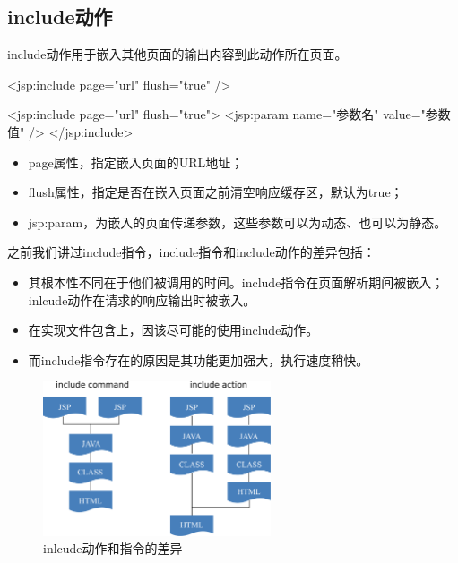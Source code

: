 \subsection{include动作} 

include动作用于嵌入其他页面的输出内容到此动作所在页面。


\begin{jspCode}
  <jsp:include page="url" flush="true" />
\end{jspCode}

\begin{jspCode}
  <jsp:include page="url" flush="true">
    <jsp:param name="参数名" value="参数值" />
  </jsp:include>
\end{jspCode}

\begin{itemize}
\item page属性，指定嵌入页面的URL地址；
\item flush属性，指定是否在嵌入页面之前清空响应缓存区，默认为true；
\item jsp:param，为嵌入的页面传递参数，这些参数可以为动态、也可以为静态。
\end{itemize}

之前我们讲过include指令，include指令和include动作的差异包括：

\begin{itemize}
\item 其根本性不同在于他们被调用的时间。include指令在页面解析期间被嵌入；inlcude动作在请求的响应输出时被嵌入。
\item {\hei\Red 在实现文件包含上，因该尽可能的使用include动作。}
\item 而include指令存在的原因是其功能更加强大，执行速度稍快。
\end{itemize}

\begin{figure}[htb]
\centering
\includegraphics[width=0.6\textwidth]{images/JavaEE-JSP/fig-include-action-and-command.pdf}
\caption{inlcude动作和指令的差异}
\label{fig:include-action-and-command}
\end{figure}

